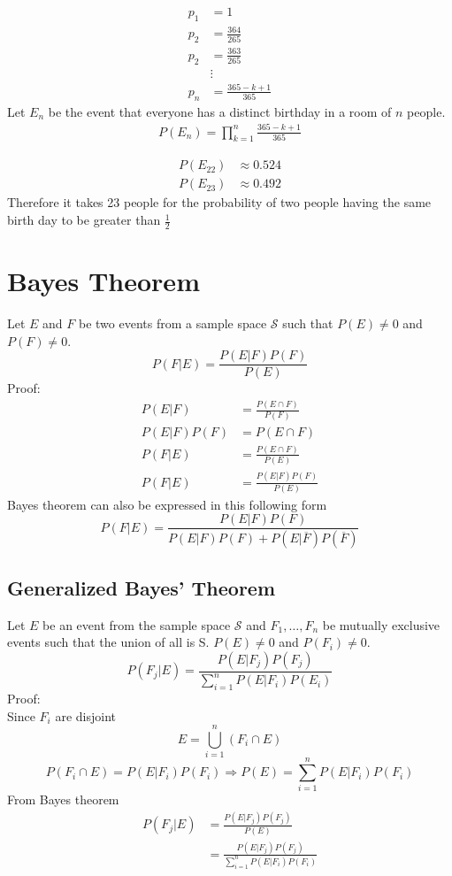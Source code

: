 \documentclass{article}
\theoremstyle{mytheoremstyle}
\theoremstyle{mytheoremstyle}
\theoremstyle{myproblemstyle}
\begin{document}
    \begin{align*}
        p_1 &= 1 \\
        p_2 &= \frac{364}{265} \\
        p_2 &= \frac{363}{265} \\
            &\vdots \\
        p_n &= \frac{365-k+1}{365}
    \end{align*}
    Let $E_n$ be the event that everyone has a distinct birthday in a room of
    $n$ people.
    \begin{align*}
        P(E_n) = \prod_{k=1}^n \frac{365-k+1}{365}
    \end{align*}

    \begin{align*}
        P(E_22)&\approx 0.524 \\
        P(E_23)&\approx 0.492
    \end{align*}
    Therefore it takes 23 people for the probability of two people having the
    same birth day to be greater than $\frac{1}{2}$

    \section*{Bayes Theorem}
    Let $E$ and $F$ be two events from a sample space $\mathcal{S}$ such that
    $P(E) \ne 0$ and $P(F) \ne 0$.
    \[
        P(F | E) = \frac{P(E | F) P(F)}{P(E)}
    \]
    Proof:
    \begin{align*}
        P(E | F) &= \frac{P(E\cap F)}{P(F)} \\
        P(E | F)P(F) &= P(E\cap F)  \\
        P(F | E) &= \frac{P(E\cap F)}{P(E)} \\
        P(F | E) &= \frac{P(E | F)P(F)}{P(E)}
    \end{align*}
    Bayes theorem can also be expressed in this following form
    \[
        P(F|E) = \frac{P(E|F)P(F)}{P(E|F)P(F) + P(E|\overline{F})P(\overline{F})}
    \]

    \subsection*{Generalized Bayes' Theorem}
    Let $E$ be an event from the sample space $\mathcal{S}$ and $F_1,\dots,F_n$ be mutually
    exclusive events such that the union of all is S. $P(E)\ne 0$ and
    $P(F_i)\ne0$.
    \[
        P(F_j | E) = \frac{P(E | F_j) P(F_j)}{\sum_{i=1}^{n} P(E | F_i)P(E_i)}
    \]
    Proof: \\
    Since $F_i$ are disjoint
    \[
        E=\bigcup_{i=1}^n (F_i \cap E)
    \]
    \[
        P(F_i\cap E) = P(E | F_i) P(F_i) \Rightarrow P(E) = \sum_{i=1}^{n} P(E|F_i)P(F_i)
    \]
    From Bayes theorem
    \begin{align*}
        P(F_j | E) &= \frac{P(E | F_j) P(F_j)}{P(E)} \\
                   &= \frac{P(E | F_j) P(F_j)}{\sum_{i=1}^{n} P(E|F_i)P(F_i)}
    \end{align*}
\end{document}
